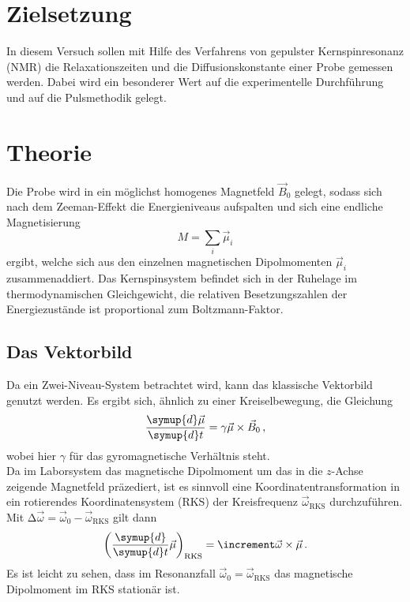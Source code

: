\section{Zielsetzung}

    \noindent In diesem Versuch sollen mit Hilfe des Verfahrens von gepulster Kernspinresonanz (NMR) die Relaxationszeiten und die Diffusionskonstante einer Probe gemessen werden. 
    Dabei wird ein besonderer Wert auf die experimentelle Durchführung und auf die Pulsmethodik gelegt.  


\section{Theorie}
\label{sec:theorie}

    \noindent Die Probe wird in ein möglichst homogenes Magnetfeld $\vec{B}_0$ gelegt, sodass sich nach dem Zeeman-Effekt die Energieniveaus aufspalten und sich eine endliche Magnetisierung 
    \begin{equation*}
        M = \sum_i \vec{\mu}_i
    \end{equation*}
    ergibt, welche sich aus den einzelnen magnetischen Dipolmomenten $\vec{\mu}_i$ zusammenaddiert. Das Kernspinsystem befindet sich in der Ruhelage im thermodynamischen Gleichgewicht, die relativen Besetzungszahlen 
    der Energiezustände ist proportional zum Boltzmann-Faktor.

    \subsection{Das Vektorbild}

        \noindent Da ein Zwei-Niveau-System betrachtet wird, kann das klassische Vektorbild genutzt werden. Es ergibt sich, ähnlich zu einer Kreiselbewegung, die Gleichung 
        \begin{equation*}
            \frac{\symup{d} \vec{\mu}}{\symup{d} t} = \gamma \vec{\mu} \times \vec{B}_0\, ,
        \end{equation*}
        wobei hier $\gamma$ für das gyromagnetische Verhältnis steht. \\ 

        \noindent Da im Laborsystem das magnetische Dipolmoment um das in die $z$-Achse zeigende Magnetfeld präzediert, ist es sinnvoll eine Koordinatentransformation in ein rotierendes Koordinatensystem (RKS) 
        der Kreisfrequenz $\vec{\omega}_\text{RKS}$ durchzuführen. Mit $\increment \vec{\omega} = \vec{\omega}_0 - \vec{\omega}_\text{RKS}$ gilt dann 
        \begin{equation*}
            \left(\frac{\symup{d}}{\symup{d}t} \vec{\mu}\right)_\text{RKS} = \increment \vec{\omega} \times \vec{\mu}\, .
        \end{equation*} 
        Es ist leicht zu sehen, dass im Resonanzfall $\vec{\omega}_0 = \vec{\omega}_\text{RKS}$ das magnetische Dipolmoment im RKS stationär ist. \\

